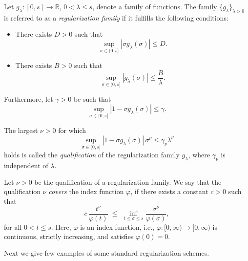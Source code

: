 \documentclass[twoside,11pt]{article}
\begin{document}
\begin{definition}\label{def:regularization}
Let $g_\lambda: [0,s] \to \mathbb{R}$, $0 < \lambda \leq s$, denote a family of functions. 
The family $\{g_\lambda\}_{\lambda > 0}$ is referred to as a \emph{regularization family} if it fulfills the following conditions:
\begin{itemize}
    \item[\textnormal{(i)}] There exists $D > 0$ such that 
    \[
        \sup_{\sigma \in (0,s]} |\sigma g_\lambda(\sigma)| \leq D.
    \]
    \item[\textnormal{(ii)}] There exists $B > 0$ such that 
    \[
        \sup_{\sigma \in (0,s]} |g_\lambda(\sigma)| \leq \frac{B}{\lambda}.
    \]
\end{itemize}
Furthermore, let $\gamma > 0$ be such that 
\[
    \sup_{\sigma \in (0,s]} |1 - \sigma g_\lambda(\sigma)| \leq \gamma.
\]

\noindent
The largest $\nu > 0$ for which \[ \sup_{\sigma \in (0,s]} |1 - \sigma g_\lambda(\sigma)| \, \sigma^\nu \leq \gamma_\nu \lambda^\nu \] holds is called the \emph{qualification} of the regularization family $g_\lambda$, where $\gamma_\nu$ is independent of $\lambda$.

\end{definition}
\begin{definition}\label{qualfication_covering}
Let $\nu>0$ be the qualification of a regularization family.  
We say that the qualification $\nu$ \emph{covers} the index function $\varphi$, if there exists a constant $c>0$ such that
\begin{equation}\label{eq:cover}
c\,\frac{t^{\nu}}{\varphi(t)}
\;\le\;
\inf_{\,t \le \sigma \le s}
\frac{\sigma^{\nu}}{\varphi(\sigma)},
\end{equation}
for all $0 < t \le s$.
Here, $\varphi$ is an index function, i.e., $\varphi:[0,\infty)\to[0,\infty)$ is continuous, strictly increasing, and satisfies $\varphi(0)=0$.
\end{definition}


\noindent
Next we give few examples of some standard regularization schemes.
\end{document}
